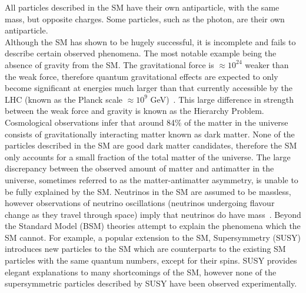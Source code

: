 \noindent
All particles described in the SM have their own antiparticle, with the same mass, but opposite charges. Some particles, such as the photon, are their own antiparticle.\\

\noindent
Although the SM has shown to be hugely successful, it is incomplete and fails to describe certain observed phenomena. The most notable example being the absence of gravity from the SM. The gravitational force is $\approx 10^{24}$ weaker than the weak force, therefore quantum gravitational effects are expected to only become significant at energies much larger than that currently accessible by the LHC (known as the Planck scale $\approx 10^{9}$ GeV)~\cite{hierarchy-problem-paper}. This large difference in strength between the weak force and gravity is known as the Hierarchy Problem. Cosmological observations infer that around 84$\%$ of the matter in the universe consists of gravitationally interacting matter known as dark matter. None of the particles described in the SM are good dark matter candidates, therefore the SM only accounts for a small fraction of the total matter of the universe. The large discrepancy between the observed amount of matter and antimatter in the universe, sometimes referred to as the matter-antimatter asymmetry, is unable to be fully explained by the SM. Neutrinos in the SM are assumed to be massless, however observations of neutrino oscillations (neutrinos undergoing flavour change as they travel through space) imply that neutrinos do have mass~\cite{fantini2020formalism}. Beyond the Standard Model (BSM) theories attempt to explain the phenomena which the SM cannot. For example, a popular extension to the SM, Supersymmetry (SUSY) introduces new particles to the SM which are counterparts to the existing SM particles with the same quantum numbers, except for their spins. SUSY provides elegant explanations to many shortcomings of the SM, however none of the supersymmetric particles described by SUSY have been observed experimentally.

